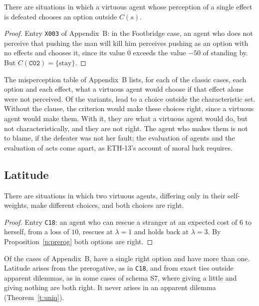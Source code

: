\documentclass{situationist-preprint}
\newcommand{\Ch}{C}
\begin{document}
\begin{proposition}\label{p:clause}
There are situations in which a virtuous agent whose perception of a single effect is defeated chooses an option outside $\Ch(s)$.
\end{proposition}

\begin{proof}
Entry \texttt{X003} of Appendix~B: in the Footbridge case, an agent who does not perceive that pushing the man will kill him perceives pushing as an option with no effects and chooses it, since its value $0$ exceeds the value $-50$ of standing by. But $\Ch(\texttt{C02})=\{\text{stay}\}$.
\end{proof}

The misperception table of Appendix~B lists, for each of the \stnclassic{} classic cases, each option and each effect, what a virtuous agent would choose if that effect alone were not perceived. Of the \stnmis{} variants, \stnmisout{} lead to a choice outside the characteristic set. Without the clause, the criterion would make these choices right, since a virtuous agent would make them. With it, they are what a virtuous agent would do, but not characteristically, and they are not right. The agent who makes them is not to blame, if the defeater was not her fault; the evaluation of agents and the evaluation of acts come apart, as ETH-13's account of moral luck requires.

\subsection{Latitude}

\begin{proposition}[Latitude]\label{p:latitude}
There are situations in which two virtuous agents, differing only in their self-weights, make different choices, and both choices are right.
\end{proposition}

\begin{proof}
Entry \texttt{C18}: an agent who can rescue a stranger at an expected cost of $6$ to herself, from a loss of $10$, rescues at $\lambda=1$ and holds back at $\lambda=3$. By Proposition~\ref{p:prerog} both options are right.
\end{proof}

Of the \stncases{} cases of Appendix~B, \stnunique{} have a single right option and \stnlatitude{} have more than one. Latitude arises from the prerogative, as in \texttt{C18}, and from exact ties outside apparent dilemmas, as in some cases of schema S7, where giving a little and giving nothing are both right. It never arises in an apparent dilemma (Theorem~\ref{t:uniq}).
\end{document}
